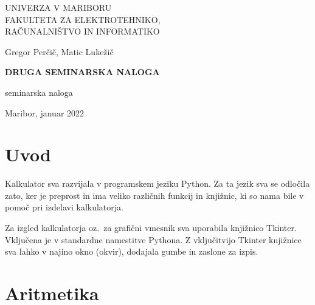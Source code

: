 \documentclass[12pt]{article}
\begin{document}
	
	\begin{center}
		\large
		\thispagestyle{empty}
		UNIVERZA V MARIBORU \\
		FAKULTETA ZA ELEKTROTEHNIKO, \\
		RAČUNALNIŠTVO IN INFORMATIKO
		
		\vspace{7cm}
		
		Gregor Perčič, Matic Lukežič
		
		\vspace{1cm}
		
		\textbf{\LARGE DRUGA SEMINARSKA NALOGA}
		
		\vspace{1cm}
		
		seminarska naloga
		
		\vspace{9cm}
		
		Maribor, januar 2022
		
	\end{center}
	
	\cleardoublepage
	
	{\hypersetup{hidelinks}\tableofcontents}
	
	\section{Uvod}
	
	Kalkulator sva razvijala v programskem jeziku Python. Za ta jezik sva se odločila zato,
	ker je preprost in ima veliko različnih funkcij in knjižnic, ki so nama bile v pomoč pri
	izdelavi kalkulatorja.
	
	Za izgled kalkulatorja oz.~za grafični vmesnik sva uporabila knjižnico Tkinter. Vključena je
	v standardne namestitve Pythona. Z vključitvijo Tkinter knjižnice sva lahko v najino okno (okvir),
	dodajala gumbe in zaslone za izpis.
	
	\section{Aritmetika}
	
\end{document}
